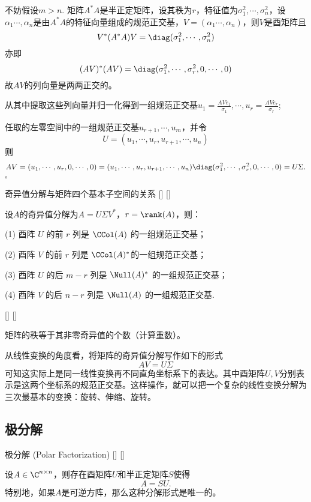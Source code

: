 \documentclass[UTF8]{ctexart}
\begin{document}
		\begin{prf}
			不妨假设$m>n$. 矩阵$A^*A$是半正定矩阵，设其秩为$r$，特征值为$\sigma_1^2,\cdots,\sigma_n^2$，设$\alpha_1\cdots,\alpha_n$是由$A^*A$的特征向量组成的规范正交基，$V=(\alpha_1\cdots,\alpha_n)$，则$V$是酉矩阵且\[V^*(A^*A)V=\diag(\sigma_1^2,\cdots,\sigma_n^2)\]
			亦即\[(AV)^*(AV)=\diag(\sigma_1^2,\cdots,\sigma_r^2,0,\cdots,0)\]
			故$AV$的列向量是两两正交的。

			从其中提取这些列向量并归一化得到一组规范正交基$\displaystyle u_1=\frac{AVe_1}{\sigma_1},\cdots, u_r=\frac{AVe_r}{\sigma_r} $;

			任取的左零空间中的一组规范正交基$u_{r+1},\cdots,u_m$，并令\[
			U=(u_1,\cdots,u_r,u_{r+1},\cdots,u_n)
			\]
			则\[AV=(u_1,\cdots,u_r,0,\cdots,0)=(u_1,\cdots,u_r,u_{r+1},\cdots,u_n)\diag(\sigma_1^2,\cdots,\sigma_r^2,0,\cdots,0)=U\Sigma.
			\]
			$\square$
		\end{prf}

		\begin{ppt}
			[]
			{奇异值分解与矩阵四个基本子空间的关系}
			[]
			[]
			
            设$A$的奇异值分解为$A=U\Sigma V^{*}$，$r=\rank(A)$，则：

			(1) 酉阵 $U$ 的前 $r$ 列是 $\CCol(A)$ 的一组规范正交基；

			(2) 酉阵 $V$ 的前 $r$ 列是 $\CCol(A)^*$的一组规范正交基；

			(3) 酉阵 $U$ 的后 $m-r$ 列是 $\Null(A)^*$ 的一组规范正交基；

			(4) 酉阵 $V$ 的后 $n-r$ 列是 $\Null(A)$ 的一组规范正交基.
		\end{ppt}

		\begin{ppt}
			[]
			{}
			[]
			[]
			
			矩阵的秩等于其非零奇异值的个数（计算重数）。
		\end{ppt}

		从线性变换的角度看，将矩阵的奇异值分解写作如下的形式\[AV=U\Sigma\]
		可知这实际上是同一线性变换再不同直角坐标系下的表达。其中酉矩阵$U,V$分别表示是这两个坐标系的规范正交基。这样操作，就可以把一个复杂的线性变换分解为三次最基本的变换：旋转、伸缩、旋转。

	\subsection{极分解}

		\begin{thm}
			[]
			{极分解 (Polar Factorization)}
			[]
			[]
  
			设$A\in\C^{n\times n}$，则存在酉矩阵$U$和半正定矩阵$S$使得\[A=SU.\]
			特别地，如果$A$是可逆方阵，那么这种分解形式是唯一的。
		\end{thm}
\end{document}
